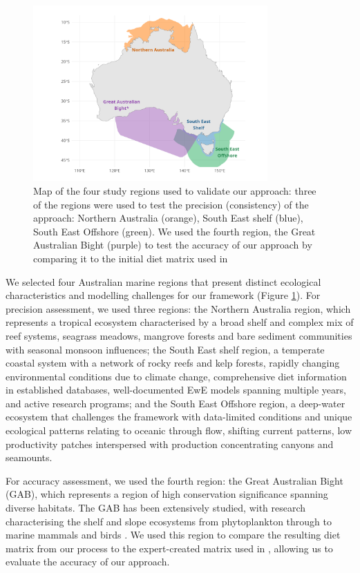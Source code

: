 \begin{figure}[htbp]
    \centering
    \includegraphics[width=0.8\textwidth]{figures/validation_regions.png}
    \caption{Map of the four study regions used to validate our approach: three of the regions were used to test the precision (consistency) of the approach: Northern Australia (orange), South East shelf (blue), South East Offshore (green). We used the fourth region, the Great Australian Bight (purple) to test the accuracy of our approach by comparing it to the initial diet matrix used in \citep{Fulton2018}}
    \label{fig:validation_regions}
    \end{figure}

We selected four Australian marine regions that present distinct ecological characteristics and modelling challenges for our framework (Figure \ref{fig:validation_regions}). For precision assessment, we used three regions: the Northern Australia region, which represents a tropical ecosystem characterised by a broad shelf and complex mix of reef systems, seagrass meadows, mangrove forests and bare sediment communities with seasonal monsoon influences; the South East shelf region, a temperate coastal system with a network of rocky reefs and kelp forests, rapidly changing environmental conditions due to climate change, comprehensive diet information in established databases, well-documented EwE models spanning multiple years, and active research programs; and the South East Offshore region, a deep-water ecosystem that challenges the framework with data-limited conditions and unique ecological patterns relating to oceanic through flow, shifting current patterns, low productivity patches interspersed with production concentrating canyons and seamounts.

For accuracy assessment, we used the fourth region: the Great Australian Bight (GAB), which represents a region of high conservation significance spanning diverse habitats. The GAB has been extensively studied, with research characterising the shelf and slope ecosystems from phytoplankton through to marine mammals and birds \citep{goldsworthy2013trophodynamics, Fulton2018}. We used this region to compare the resulting diet matrix from our process to the expert-created matrix used in \citep{Fulton2018}, allowing us to evaluate the accuracy of our approach.

